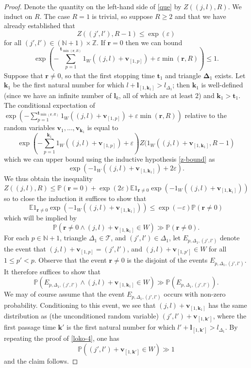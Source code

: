 \documentclass[12pt,a4paper,reqno]{amsart}
\numberwithin{equation}{section}
\theoremstyle{plain}
\theoremstyle{definition}
\renewcommand\P{\mathbb{P}}
\newcommand\E{\mathbb{E}}
\newcommand\Z{\mathbb{Z}}
\newcommand\N{\mathbb{N}}
\renewcommand\k{\mathbf{k}}
\renewcommand\v{\mathbf{v}}
\renewcommand\t{\mathbf{t}}
\renewcommand\r{\mathbf{r}}
\renewcommand\l{\mathbf{l}}
\newcommand\eps{\varepsilon}
\begin{document}
\begin{proof}  Denote the quantity on the left-hand side of \eqref{que} by $Z( (j,l), R )$.
We induct on $R$.  The case $R=1$ is trivial, so suppose $R \geq 2$ and that we have already established that
\begin{equation}\label{z-bound}
 Z((j',l'), R-1) \leq \exp(\eps)
\end{equation}
for all $(j',l') \in (\N+1) \times \Z$. If $\r=0$ then we can bound
$$ \exp\left( - \sum_{p=1}^{\t_{\min(\r,R)}} 1_W((j,l) + \v_{[1,p]} ) + \eps \min(\r,R) \right)  \leq 1.$$
 Suppose that $\r \neq 0$, so that the first stopping time $\t_1$ and triangle $\mathbf{\Delta}_1$ exists.  Let $\k_1$ be the first natural number for which $l + \l_{[1,\k_1]} > l_{\Delta_1}$; then $\k_1$ is well-defined (since we have an infinite number of $\l_k$, all of which are at least $2$) and $\k_1 > \t_1$.  The conditional expectation of $\exp( - \sum_{p=1}^{\t_{\min(\r,R)}} 1_W((j,l) + \v_{[1,p]} ) + \eps \min(\r,R))$ relative to the random variables $\v_1,\dots,\v_{\k_1}$ is equal to
$$  \exp\left( -  \sum_{p=1}^{\k_1} 1_W((j,l) + \v_{[1,p]} ) + \eps \right) Z( 1_W((j,l) + \v_{[1,\k_1]}, R-1)$$
which we can upper bound using the inductive hypothesis \eqref{z-bound} as
$$  \exp\left( -  1_W((j,l) + \v_{[1,\k_1]} ) + 2\eps \right).$$
We thus obtain the inequality
$$
Z( (j,l), R) \leq \P( \r = 0 ) + \exp(2\eps) \E 1_{\r \neq 0} \exp( - 1_W((j,l) + \v_{[1,\k_1]} ) )
$$
so to close the induction it suffices to show that
$$ \E 1_{\r \neq 0} \exp( - 1_W((j,l) + \v_{[1,\k_1]} ) ) \leq \exp(-\eps) \P( \r \neq 0)$$
which will be implied by
$$ \P( \r \neq 0 \wedge (j,l) + \v_{[1,\k_1]} \in W ) \gg \P( \r \neq 0 ).$$
For each $p \in \N+1$, triangle $\Delta_1 \in {\mathcal T}$, and $(j',l') \in \Delta_1$, let $E_{p,\Delta_1,(j',l')}$ denote the event that $(j,l) + \v_{[1,p]} = (j',l')$, and $(j,l) + \v_{[1,p']} \in W$ for all $1 \leq p' < p$.  Observe that the event $\r \neq 0$ is the disjoint of the events $E_{p,\Delta_1,(j',l')}$.  It therefore suffices to show that
$$ \P( E_{p,\Delta_1,(j',l')} \wedge (j,l) + \v_{[1,\k_1]} \in W ) \gg \P( E_{p,\Delta_1,(j',l')} ).$$
We may of course assume that the event $E_{p,\Delta_1,(j',l')}$ occurs with non-zero probability. Conditioning to this event, we see that $(j,l) + \v_{[1,\k_1]}$ has the same distribution as (the unconditioned random variable) $(j',l') + \v_{[1,\k']}$, where the first passage time $\k'$ is the first natural number for which $l' + \l_{[1,\k']} > l_{\Delta_1}$.  By repeating the proof of \eqref{loko-4}, one has
$$
 \P( (j',l') + \v_{[1,\k']} \in W) \gg 1
$$
and the claim follows.
\end{proof}
\end{document}
